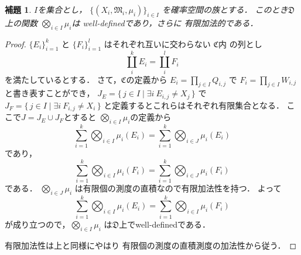 \documentclass[leqno, a4paper, 12pt]{jsarticle}
\newtheorem{lem}[thm]{補題}
\begin{document}
\begin{lem}\label{lem:yuugen}
$I$を集合とし，
$\{(X_{i}, \mathfrak{M}_{i}, \mu_{i})\}_{i\in I}$
を確率空間の族とする．
このとき$\mathfrak{D}$上の関数
$\bigotimes_{i\in I}\mu_{i}$は
well-definedであり，さらに
有限加法的である．
\end{lem}
\begin{proof}
$\{E_{i}\}_{i=1}^{k}$
と
$\{F_{i}\}_{i=1}^{l}$
はそれぞれ互いに交わらない
$\mathfrak{C}$内
の列とし
\[
\coprod_{i}^{k}E_{i}
=\coprod_{i}^{l}F_{i}
\]
を満たしているとする．
さて，$\mathfrak{C}$の定義から
$E_{i}=\prod_{j\in I}Q_{i, j}$
で
$F_{i}=\prod_{j\in I}W_{i, j}$と書き表すことができ，
$J_{E}=\{\, j\in I\mid \exists i\ E_{i, j}\neq X_{j}\, \}$
で
$J_{F}=\{\, j\in I\mid \exists i\  F_{i, j}\neq X_{i}\, \}$
と定義するとこれらはそれぞれ有限集合となる．
ここで$J=J_{E}\cup J_{F}$とすると
$\bigotimes_{i\in I}\mu_{i}$の定義から
\[
\sum_{i=1}^{k}\bigotimes_{i\in I}\mu_{i}(E_{i})
=
\sum_{i=1}^{k}\bigotimes_{i\in J}\mu_{i}(E_{i})
\]
であり，
\[
\sum_{i=1}^{k}\bigotimes_{i\in I}\mu_{i}(F_{i})
=
\sum_{i=1}^{k}\bigotimes_{i\in J}\mu_{i}(F_{i})
\]
である．
$\bigotimes_{i\in J}\mu_{i}$
は有限個の測度の直積なので有限加法性を持つ．
よって
\[
\sum_{i=1}^{k}\bigotimes_{i\in I}\mu_{i}(E_{i})
=
\sum_{i=1}^{k}\bigotimes_{i\in I}\mu_{i}(F_{i})
\]
が成り立つので，$\bigotimes_{i\in I}\mu_{i}$
は$\mathfrak{D}$上でwell-definedである．

有限加法性は上と同様にやはり
有限個の測度の直積測度の加法性から従う．
\end{proof}
\end{document}
